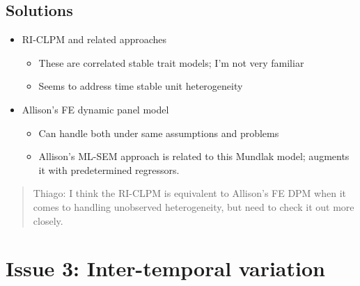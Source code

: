 \documentclass[
  letterpaper,
  DIV=11,
  numbers=noendperiod]{scrartcl}
\providecommand{\tightlist}{%
  \setlength{\itemsep}{0pt}\setlength{\parskip}{0pt}}\usepackage{longtable,booktabs,array}
\begin{document}
\subsection{Solutions}\label{solutions-1}

\begin{itemize}
\tightlist
\item
  RI-CLPM and related approaches

  \begin{itemize}
  \tightlist
  \item
    These are correlated stable trait models; I'm not very familiar
  \item
    Seems to address time stable unit heterogeneity
  \end{itemize}
\item
  Allison's FE dynamic panel model

  \begin{itemize}
  \tightlist
  \item
    Can handle both under same assumptions and problems
  \item
    Allison's ML-SEM approach is related to this Mundlak model; augments
    it with predetermined regressors.
  \end{itemize}
\end{itemize}

\begin{quote}
Thiago: I think the RI-CLPM is equivalent to Allison's FE DPM when it
comes to handling unobserved heterogeneity, but need to check it out
more closely.
\end{quote}

\section{Issue 3: Inter-temporal
variation}\label{issue-3-inter-temporal-variation}
\end{document}
